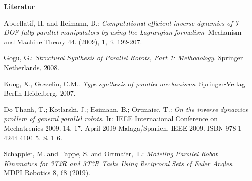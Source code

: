 \documentclass[fleqn,a4paper,10pt]{article}
\begin{document}
\begingroup\Large{\textbf{Literatur}}\endgroup
\begingroup %
\renewcommand{\section}[1]{} %
\begin{thebibliography}{99}

Abdellatif, H. and Heimann, B.:
\newblock \textit{Computational efficient inverse dynamics of 6-DOF fully parallel manipulators by using the Lagrangian formalism}.
\newblock Mechanism and Machine Theory 44. (2009), 1, S. 192-207.

Gogu, G.:
\newblock \textit{Structural Synthesis of Parallel Robots, Part 1: Methodology}.
\newblock Springer Netherlands, 2008.

Kong, X.; Gosselin, C.M.:
\newblock \textit{Type synthesis of parallel mechanisms}.
\newblock Springer-Verlag Berlin Heidelberg, 2007.

Do Thanh, T.; Kotlarski, J.; Heimann, B.; Ortmaier, T.:
\newblock \textit{On the inverse dynamics problem of general parallel robots}.
\newblock In: IEEE International Conference on Mechatronics 2009. 14.-17. April 2009 Malaga/Spanien. IEEE 2009. ISBN 978-1-4244-4194-5. S. 1-6. 

Schappler, M. and Tappe, S. and Ortmaier, T.:
\newblock \textit{Modeling Parallel Robot Kinematics for 3T2R and 3T3R Tasks Using Reciprocal Sets of Euler Angles}.
\newblock MDPI Robotics 8, 68 (2019).

\end{thebibliography}
\endgroup %

\clearpage  %
\end{document}
